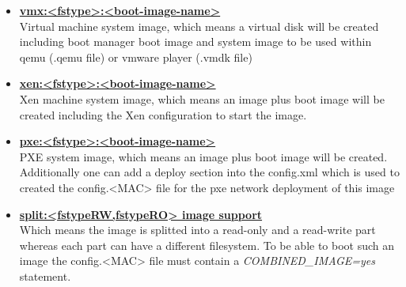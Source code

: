 \begin{itemize}
	\item \textbf{\underline{vmx:<fstype>:<boot-image-name>}}\\
          Virtual machine system image, which means a virtual disk will
          be created including boot manager boot image and system image
          to be used within qemu (.qemu file) or vmware player (.vmdk file)
    \item \textbf{\underline{xen:<fstype>:<boot-image-name>}}\\
          Xen machine system image, which means an image plus boot image will
          be created including the Xen configuration to start the image.
	\item \textbf{\underline{pxe:<fstype>:<boot-image-name>}}\\
          PXE system image, which means an image plus boot image will
          be created. Additionally one can add a deploy section into the
          config.xml which is used to created the config.<MAC> file for
          the pxe network deployment of this image
	\item \textbf{\underline{split:<fstypeRW,fstypeRO> image support}}\\
          Which means the image is splitted into a read-only and a
          read-write part whereas each part can have a different
          filesystem. To be able to boot such an image the config.<MAC>
          file must contain a \textit{COMBINED\_IMAGE=yes} statement.
\end{itemize}
